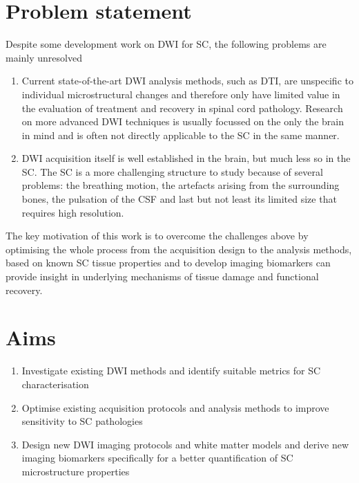 \section{Problem statement}
Despite some development work on \gls{DWI} for \gls{SC}, the following problems are mainly unresolved 
\begin{enumerate}
\item Current state-of-the-art \gls{DWI} analysis methods, such as \gls{DTI}, are unspecific to individual microstructural changes and therefore only have limited value in the evaluation of treatment and recovery in spinal cord pathology. Research on more advanced \gls{DWI} techniques is usually focussed on the only the brain in mind and is often not directly applicable to the \gls{SC} in the same manner.
\item \gls{DWI} acquisition itself is well established in the brain, but much less so in the \gls{SC}. The \gls{SC} is a more challenging structure to study because of several problems: the breathing motion, the artefacts arising from the surrounding bones, the pulsation of the {\gls{CSF}} and last but not least its limited size that requires high resolution.  
\end{enumerate} 
The key motivation of this work is to overcome the challenges above by optimising the whole process from the acquisition design to the analysis methods, based on known \gls{SC} tissue properties and to develop imaging biomarkers can provide insight in underlying mechanisms of tissue damage and functional recovery.

\section{Aims}
\begin{enumerate}
  \item Investigate existing \gls{DWI} methods and identify suitable metrics for \gls{SC} characterisation
  \item Optimise existing acquisition protocols and analysis methods to improve sensitivity to \gls{SC} pathologies
  \item Design new \gls{DWI} imaging protocols and white matter models and derive new imaging biomarkers specifically for a better quantification of \gls{SC} microstructure properties
\end{enumerate}

